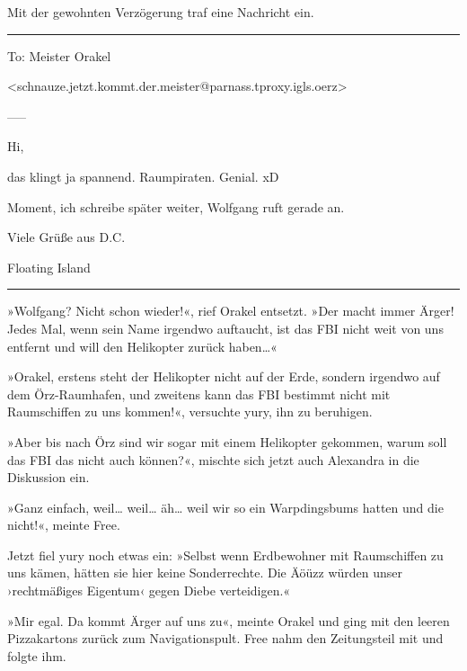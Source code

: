 Mit der gewohnten Verzögerung traf eine Nachricht ein.

\noindent \parbox{\textwidth}{ \vspace{3ex} \hrule \vspace{3ex}

    \begin{footnotesize}
    \begin{ttfamily}

\noindent To: Meister Orakel

\noindent <schnauze.jetzt.kommt.der.meister@parnass.tproxy.igls.oerz>

\noindent -----

\noindent Hi,

\noindent das klingt ja spannend. Raumpiraten. Genial. xD

\noindent Moment, ich schreibe später weiter, Wolfgang ruft gerade an.

\noindent Viele Grüße aus D.C.

\noindent Floating Island

    \end{ttfamily}
    \end{footnotesize}

\vspace{3ex} \hrule \vspace{3ex} }


»Wolfgang? Nicht schon wieder!«, rief Orakel entsetzt. »Der macht immer Ärger! Jedes Mal, wenn sein Name irgendwo auftaucht, ist das FBI nicht weit von uns entfernt und will den Helikopter zurück haben…«

»Orakel, erstens steht der Helikopter nicht auf der Erde, sondern irgendwo auf dem Örz-Raumhafen, und zweitens kann das FBI bestimmt nicht mit Raumschiffen zu uns kommen!«, versuchte yury, ihn zu beruhigen.

»Aber bis nach Örz sind wir sogar mit einem Helikopter gekommen, warum soll das FBI das nicht auch können?«, mischte sich jetzt auch Alexandra in die Diskussion ein.

»Ganz einfach, weil… weil… äh… weil wir so ein Warpdingsbums hatten und die nicht!«, meinte Free.

Jetzt fiel yury noch etwas ein: »Selbst wenn Erdbewohner mit Raumschiffen zu uns kämen, hätten sie hier keine Sonderrechte. Die Äöüzz würden unser ›rechtmäßiges Eigentum‹ gegen Diebe verteidigen.«

»Mir egal. Da kommt Ärger auf uns zu«, meinte Orakel und ging mit den leeren Pizzakartons zurück zum Navigationspult. Free nahm den Zeitungsteil mit und folgte ihm.

